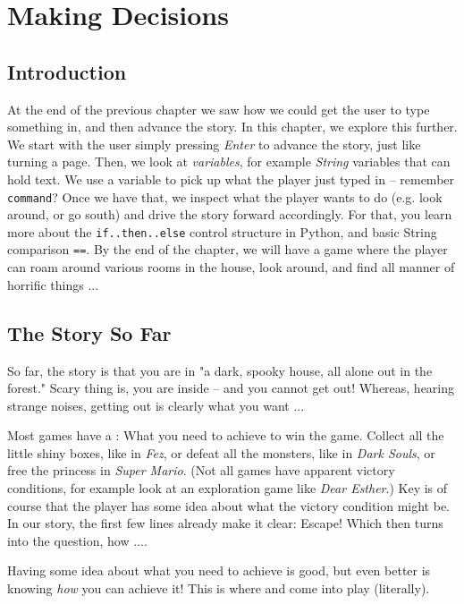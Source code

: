 \chapter{Making Decisions} 

\section{Introduction} 

At the end of the previous chapter we saw how we could get the user to type something in, and then advance the story. In this chapter, we explore this further. We start with the user simply pressing \emph{Enter} to advance the story, just like turning a page. Then, we look at \textit{variables}, for example \textit{String} variables that can hold text. We use a variable to pick up what the player just typed in -- remember \texttt{command}? Once we have that, we inspect what the player wants to do (e.g. look around, or go south) and drive the story forward accordingly. For that, you learn more about the \texttt{if..then..else} control structure in Python, and basic String comparison \texttt{==}. By the end of the chapter, we will have a game where the player can roam around various rooms in the house, look around, and find all manner of horrific things ... 

\section{The Story So Far} 

So far, the story is that you are in "a dark, spooky house, all alone out in the forest." Scary thing is, you are inside -- and you cannot get out! Whereas, hearing strange noises, getting out is clearly what you want ... 

 \begin{Gmd} Most games have a \textit{\victorycondition}: What you need to achieve to win the game. Collect all the little shiny boxes, like in \emph{Fez}, or defeat all the monsters, like in \emph{Dark Souls}, or free the princess in \emph{Super Mario}. (Not all games have apparent victory conditions, for example look at an exploration game like \emph{Dear Esther}.) Key is of course that the player has some idea about what the victory condition might be. In our story, the first few lines already make it clear: Escape! Which then turns into the question, how ....  \expend  
  \end{Gmd} 
  
  Having some idea about what you need to achieve is good, but even better is knowing \emph{how} you can achieve it! This is where  and  come into play (literally).   
      
